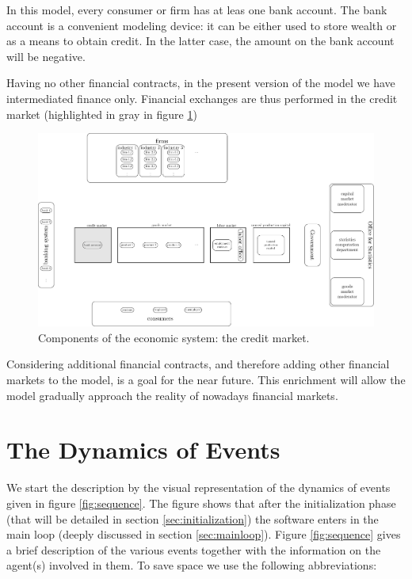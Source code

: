\documentclass{book}
\begin{document}
In this model, every consumer or firm has at leas one bank account. The bank account is a convenient modeling device: it can be either used to store wealth or as a means to obtain credit. In the latter case, the amount on the bank account will be negative.

Having no other financial contracts, in the present version of the model we have intermediated finance only. %
Financial exchanges are thus performed in the credit market (highlighted in gray in figure \ref{fig:componentsc3})

\begin{figure}[htp]
\hskip-1cm\includegraphics[scale=0.5]{agents_and_interactions_figure1c3-0.pdf}
	\caption{Components of the economic system: the credit market.}
	\label{fig:componentsc3}
\end{figure}

Considering additional financial contracts, and therefore adding other financial markets to the model, is a goal for the near future. This enrichment will allow the model gradually approach the reality of nowadays financial markets.




\newpage
\chapter{The Dynamics of Events}\label{chap:events}

We start the description by the visual representation of the dynamics of events given in figure \ref{fig:sequence}. The figure shows that after the initialization phase (that will be detailed in section \ref{sec:initialization}) the software enters in the main loop (deeply discussed in section \ref{sec:mainloop}). Figure \ref{fig:sequence} gives a brief description of the various events together with the information on the agent(s) involved in them. To save space we use the following abbreviations:
\end{document}
